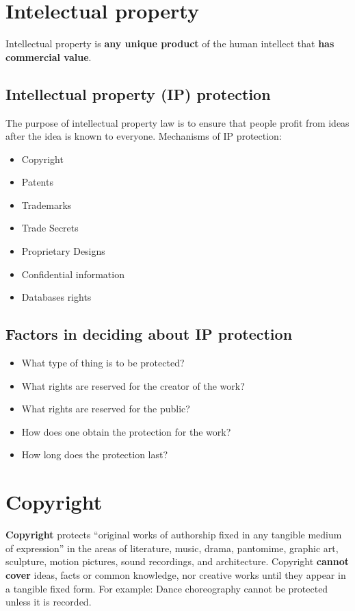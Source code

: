 \documentclass{article}
\begin{document}
\tableofcontents

\newpage

\section{Intelectual property}

\begin{flushleft}
Intellectual property is \textbf{any unique product} of the human intellect that \textbf{has commercial value}.
\end{flushleft}

\subsection{Intellectual property (IP) protection}
\begin{flushleft}
The purpose of intellectual property law is to ensure that people profit from ideas after the idea is known to everyone. Mechanisms of IP protection:
\begin{itemize}
  \item Copyright
  \item Patents 
  \item Trademarks
  \item Trade Secrets
  \item Proprietary Designs
  \item Confidential information
  \item Databases rights
\end{itemize}
\end{flushleft}

\subsection{Factors in deciding about IP protection}

\begin{itemize}
  \item What type of thing is to be protected?
  \item What rights are reserved for the creator of the work?
  \item What rights are reserved for the public?
  \item How does one obtain the protection for the work?
  \item How long does the protection last?
\end{itemize}

\section{Copyright}
\begin{flushleft}
\textbf{Copyright} protects “original works of authorship fixed in any tangible medium of expression” in the areas of literature, music, drama, pantomime, graphic art, sculpture, motion pictures, sound recordings, and architecture. Copyright \textbf{cannot cover} ideas, facts or common knowledge, nor creative works until they appear in a tangible fixed form. For example: Dance choreography cannot be protected unless it is recorded.
\end{flushleft}
\end{document}
